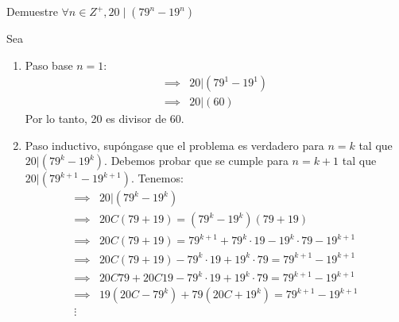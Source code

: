 




 
\begin{problema}
    Demuestre $\forall n \in Z^{+}, 20 \mid\left(79^n-19^n\right)$
    \begin{dem}
        Sea 
        \begin{enumerate}
            \item Paso base $n=1$: 
            \begin{align*}
                \implies &20|(79^1-19^1)\\
                \implies & 20|(60)
            \end{align*}
            Por lo tanto, 20 es divisor de 60.
            \item Paso inductivo, supóngase que el problema es verdadero para $n=k$ tal que  $20|(79^k-19^k)$. Debemos probar que se cumple para $n=k+1$ tal que $20|(79^{k+1}-19^{k+1})$. Tenemos: 
            \begin{align*}
                \implies & 20|(79^k-19^k)\\
                \implies & 20C(79+19)= (79^k-19^k)(79+19)\\
                \implies & 20C(79+19) =  79^{k+1}+79^k\cdot19 -19^k\cdot 79 -19^{k+1}\\
                \implies & 20C(79+19)-79^k\cdot19 +19^k\cdot 79 =  79^{k+1} -19^{k+1}\\
                \implies & 20C79+20C19-79^k\cdot19 +19^k\cdot 79 =  79^{k+1} -19^{k+1}\\
                \implies & 19(20C -79^k)+79(20C+19^k)=  79^{k+1} -19^{k+1}\\
                \vdots
            \end{align*}
        \end{enumerate}
    \end{dem}

\end{problema}
%
%

